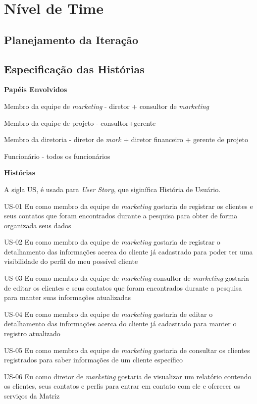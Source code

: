 \chapter[Nível de Time]{Nível de Time}

\section{Planejamento da Iteração}

\section{Especificação das Histórias}

\textbf{Papéis Envolvidos}

Membro da equipe de \textit{marketing} - diretor + consultor de \textit{marketing}

Membro da equipe de projeto - consultor+gerente

Membro da diretoria - diretor de \textit{mark} + diretor financeiro + gerente de projeto

Funcionário - todos os funcionários

\textbf{Histórias}

A sigla US, é usada para \textit{User Story}, que siginífica História de Usuário.

US-01 Eu como membro da equipe de \textit{marketing} gostaria de registrar os clientes e seus contatos que foram encontrados durante a pesquisa para obter de forma organizada seus dados


US-02 Eu como membro da equipe de \textit{marketing} gostaria de registrar o detalhamento das informações acerca do cliente já cadastrado para poder ter uma visibilidade do perfil do meu possível cliente


US-03 Eu como membro da equipe de \textit{marketing} consultor de \textit{marketing} gostaria de editar os clientes e seus contatos que foram encontrados durante a pesquisa para manter suas informações atualizadas


US-04 Eu como membro da equipe de \textit{marketing} gostaria de editar o detalhamento das informações acerca do cliente já cadastrado para manter o registro atualizado


US-05 Eu como membro da equipe de \textit{marketing} gostaria de consultar os clientes registrados para saber informações de um cliente específico


US-06 Eu como diretor de \textit{marketing} gostaria de visualizar um relatório contendo os clientes, seus contatos e perfis para entrar em contato com ele e oferecer os serviços da Matriz


